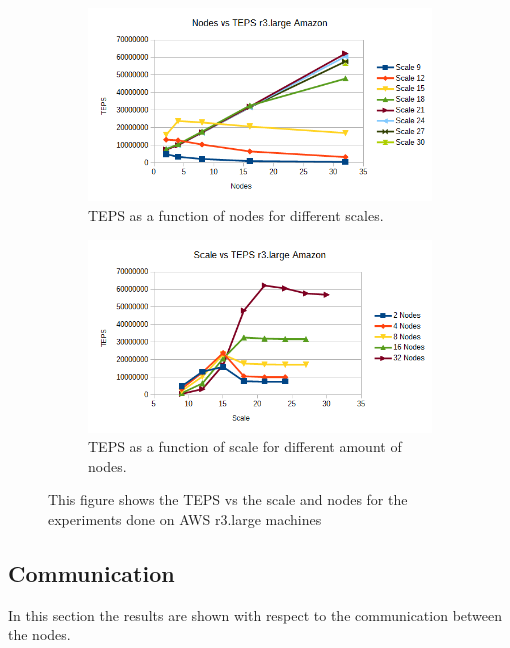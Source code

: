 \begin{figure}[!h]
	\centering
	\begin{subfigure}{.5\textwidth}
		\centering
		\includegraphics[width=\linewidth]{images/nodes_r3_amazon.png}
		\caption{TEPS as a function of nodes for different scales.}
		\label{fig:nodes_r3_amazon}
	\end{subfigure}%
	\begin{subfigure}{.5\textwidth}
		\centering
		\includegraphics[width=\linewidth]{images/scale_r3_amazon.png}
		\caption{TEPS as a function of scale for different amount of nodes.}
		\label{fig:scale_r3_amazon}
	\end{subfigure}
	\caption{This figure shows the TEPS vs the scale and nodes for the experiments done on AWS r3.large machines}
	\label{fig:r3_amazon}
\end{figure}


\subsection{Communication}
In this section the results are shown with respect to the communication between the nodes.
